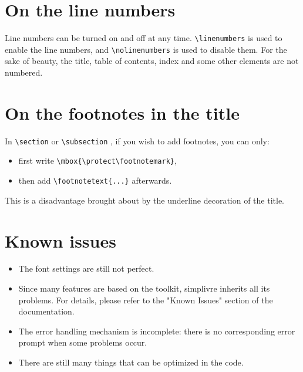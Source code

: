 \documentclass{simplivre}
\providecommand{\simplivre}{\textsf{simplivre}}
\begin{document}

\section{On the line numbers}
Line numbers can be turned on and off at any time. \lstinline|\linenumbers| is used to enable the line numbers, and \lstinline|\nolinenumbers| is used to disable them. For the sake of beauty, the title, table of contents, index and some other elements are not numbered.

\section{On the footnotes in the title}
In \lstinline|\section| or \lstinline|\subsection| , if you wish to add footnotes, you can only:
\begin{itemize}
    \item first write \lstinline|\mbox{\protect\footnotemark}|, 
    \item then add \lstinline|\footnotetext{...}| afterwards. 
\end{itemize}
This is a disadvantage brought about by the underline decoration of the title.


\section{Known issues}

\begin{itemize}[itemsep=.6em]
    \item The font settings are still not perfect.
    \item Since many features are based on the \ProjLib{} toolkit, \simplivre{} inherits all its problems. For details, please refer to the "Known Issues" section of the \ProjLib{} documentation.
    \item The error handling mechanism is incomplete: there is no corresponding error prompt when some problems occur.
    \item There are still many things that can be optimized in the code.
\end{itemize}
\end{document}
